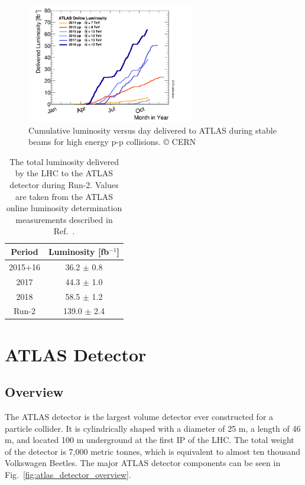 \begin{figure}
	\centering
	\includegraphics[width=0.65\textwidth]{int_lumi_vs_year}
	\caption{Cumulative luminosity versus day delivered to ATLAS during stable beams for high energy p-p collisions. © CERN}
	\label{fig:int_lumi_vs_year}
\end{figure}

\begin{table}
\centering
\begin{tabular}{|c|c|} 
\hline
Period & Luminosity [fb$^{-1}$] \\
\hline\hline
2015+16 & 36.2 $\pm$ 0.8 \\ 
\hline
2017 & 44.3 $\pm$ 1.0 \\
\hline
2018 & 58.5 $\pm$ 1.2 \\
\hline\hline
Run-2 & 139.0 $\pm$ 2.4 \\
\hline
\end{tabular}
\caption{
    The total luminosity delivered by the LHC to the ATLAS detector during Run-2.
    Values are taken from the ATLAS online luminosity determination measurements described in Ref.~\cite{ATLAS-CONF-2019-021}.
}
\label{tab:lumi_vs_period}
\end{table}

\section{ATLAS Detector}

\subsection{Overview}
The ATLAS detector is the largest volume detector ever constructed for a particle collider.
It is cylindrically shaped with a diameter of 25 m, a length of 46 m, and located 100 m underground at the first IP of the LHC.
The total weight of the detector is 7,000 metric tonnes, which is equivalent to almost ten thousand Volkswagen Beetles.
The major ATLAS detector components can be seen in Fig.~\ref{fig:atlas_detector_overview}.

